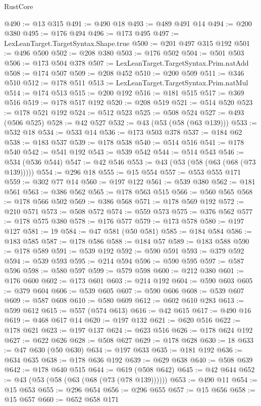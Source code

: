 \begin{lexlean}{RustCore}
\begin{coremodule}
@490 := @13 @315
@491 := @490 @18
@493 := @489 @491 @14
@494 := @200 @380
@495 := @176 @494
@496 := @173 @495
@497 := LexLeanTarget.TargetSyntax.Shape.true
@500 := @201 @497 @315 @192
@501 := @496 @500
@502 := @208 @380
@503 := @176 @502
@504 := @501 @503
@506 := @173 @504 @378
@507 := LexLeanTarget.TargetSyntax.Prim.natAdd
@508 := @174 @507
@509 := @208 @452
@510 := @200 @509
@511 := @346 @510
@512 := @178 @511
@513 := LexLeanTarget.TargetSyntax.Prim.natMul
@514 := @174 @513
@515 := @200 @192
@516 := @181 @515
@517 := @369 @516
@519 := @178 @517 @192
@520 := @208 @519
@521 := @514 @520
@523 := @178 @521 @192
@524 := @512 @523
@525 := @508 @524
@527 := @493 (@506 @525)
@528 := @42 @527
@532 := @43 (@53 (@58 (@63 @139)))
@533 := @532 @18
@534 := @533 @14
@536 := @173 @503 @378
@537 := @184 @62
@538 := @183 @537
@539 := @178 @538
@540 := @514 @516
@541 := @178 @540
@542 := @541 @192
@543 := @539 @542
@544 := @514 @543
@546 := @534 (@536 @544)
@547 := @42 @546
@553 := @43 (@53 (@58 (@63 (@68 (@73 @139)))))
@554 := @296 @18
@555 := @15 @554
@557 := @553 @555 @171
@559 := @302 @77 @14
@560 := @197 @122
@561 := @539 @380
@562 := @181 @561
@563 := @386 @562
@565 := @178 @563 @515
@566 := @560 @565
@568 := @178 @566 @502
@569 := @386 @568
@571 := @178 @569 @192
@572 := @210 @571
@573 := @508 @572
@574 := @559 @573
@575 := @376 @562
@577 := @178 @575 @380
@578 := @176 @577
@579 := @173 @578
@580 := @197 @127
@581 := 19
@584 := @47 @581 (@50 @581)
@585 := @184 @584
@586 := @183 @585
@587 := @178 @586
@588 := @184 @57
@589 := @183 @588
@590 := @178 @589
@591 := @539 @192
@592 := @590 @591
@593 := @379 @592
@594 := @539 @593
@595 := @214 @594
@596 := @590 @595
@597 := @587 @596
@598 := @580 @597
@599 := @579 @598
@600 := @212 @380
@601 := @176 @600
@602 := @173 @601
@603 := @214 @192
@604 := @590 @603
@605 := @379 @604
@606 := @539 @605
@607 := @590 @606
@608 := @539 @607
@609 := @587 @608
@610 := @580 @609
@612 := @602 @610 @283
@613 := @599 @612
@615 := @557 (@574 @613)
@616 := @42 @615
@617 := @490 @16
@619 := @468 @617 @14
@620 := @197 @132
@621 := @620 @516
@622 := @178 @621
@623 := @197 @137
@624 := @623 @516
@626 := @178 @624 @192
@627 := @622 @626
@628 := @508 @627
@629 := @178 @628
@630 := 18
@633 := @47 @630 (@50 @630)
@634 := @197 @633
@635 := @181 @192
@636 := @634 @635
@638 := @178 @636 @192
@639 := @629 @638
@640 := @508 @639
@642 := @178 @640 @515
@644 := @619 (@508 @642)
@645 := @42 @644
@652 := @43 (@53 (@58 (@63 (@68 (@73 (@78 @139))))))
@653 := @490 @11
@654 := @15 @653
@655 := @296 @654
@656 := @296 @655
@657 := @15 @656
@658 := @15 @657
@660 := @652 @658 @171

\end{coremodule}
\end{lexlean}
